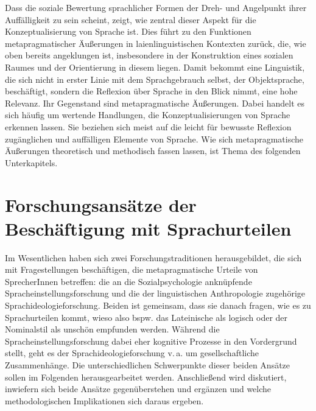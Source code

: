 Dass die soziale Bewertung sprachlicher Formen der Dreh- und Angelpunkt ihrer Auffälligkeit zu sein scheint, zeigt, wie zentral dieser Aspekt für die Konzeptualisierung von Sprache ist. 
Dies führt zu den Funktionen metapragmatischer Äußerungen in laienlinguistischen Kontexten zurück, die, wie oben bereits angeklungen ist, insbesondere in der Konstruktion eines sozialen Raumes und der Orientierung in diesem liegen. 
Damit bekommt eine Linguistik, die sich nicht in erster Linie mit dem Sprachgebrauch selbst, der Objektsprache, beschäftigt, sondern die Reflexion über Sprache in den Blick nimmt, eine hohe Relevanz. 
Ihr Gegenstand sind metapragmatische Äußerungen. 
Dabei handelt es sich häufig um wertende Handlungen, die Konzeptualisierungen von Sprache erkennen lassen. 
Sie beziehen sich meist auf die leicht für bewusste Reflexion zugänglichen und auffälligen Elemente von Sprache. 
Wie sich metapragmatische Äußerungen theoretisch und methodisch fassen lassen, ist Thema des folgenden Unterkapitels. 
\section{Forschungsansätze der Beschäftigung mit Sprachurteilen}
\label{sec: Forschungsansaetze}
Im Wesentlichen haben sich zwei Forschungstraditionen herausgebildet, die sich mit Fragestellungen beschäftigen, die metapragmatische Urteile von SprecherInnen betreffen: die an die Sozialpsychologie \citep[für einen Überblick hierzu s.][]{Graumann.2005} anknüpfende Spracheinstellungsforschung und die der linguistischen Anthropologie \citep[für einen Überblick s.][]{Wortham.2008} zugehörige Sprachideologieforschung. 
Beiden ist gemeinsam, dass sie danach fragen, wie es zu Sprachurteilen kommt, wieso also bspw. das Lateinische als logisch oder der Nominalstil als unschön empfunden werden. 
Während die Spracheinstellungsforschung dabei eher kognitive Prozesse in den Vordergrund stellt, geht es der Sprachideologieforschung v.\,a. um gesellschaftliche Zusammenhänge. 
Die unterschiedlichen Schwerpunkte dieser beiden Ansätze sollen im Folgenden herausgearbeitet werden. 
Anschließend wird diskutiert, inwiefern sich beide Ansätze gegenüberstehen und ergänzen und welche methodologischen Implikationen sich daraus ergeben. 
